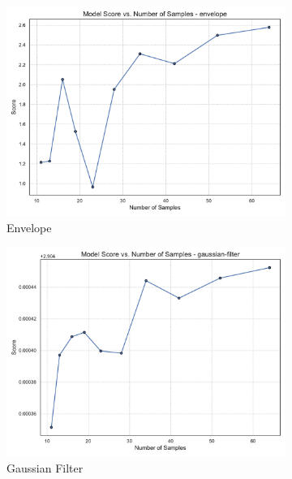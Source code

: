 \begin{figure}[htbp]
    \centering
    \begin{subfigure}[t]{0.32\textwidth}
        \includegraphics[width=\textwidth]{assets/images/05/score_by_sample_size_envelope}
        \caption{Envelope}
    \end{subfigure}
    \hfill
    \begin{subfigure}[t]{0.32\textwidth}
        \includegraphics[width=\textwidth]{assets/images/05/score_by_sample_size_gaussian-filter}
        \caption{Gaussian Filter}
    \end{subfigure}
    \hfill
    \begin{subfigure}[t]{0.32\textwidth}

\end{subfigure}
\end{figure}

